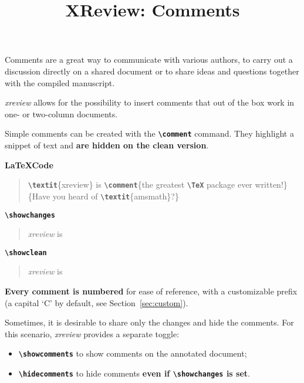 \documentclass[10pt]{article}
\title{XReview: Comments}
\date{}
\newcommand{\writecommand}[1]{\texttt{\textbf{{\textbackslash#1}}}}
\newcommand{\writearg}[1]{\{#1\}}
\begin{document}
\maketitle

Comments are a great way to communicate with various authors, to carry out a discussion directly on a shared document or to share ideas and questions together with the compiled manuscript.

\textit{xreview} allows for the possibility to insert comments that out of the box work in one- or two-column documents. 

Simple comments can be created with the \writecommand{comment} command. They highlight a snippet of text and \textbf{are hidden on the clean version}. 
~\newline

\textbf{\LaTeX Code}

\begin{quote}
\writecommand{textit}\writearg{xreview} is \writecommand{comment}\writearg{the greatest \writecommand{TeX} package ever written!}\writearg{Have you heard of \writecommand{textit}\writearg{amsmath}?}
\end{quote}

\writecommand{showchanges}
\showchanges

\begin{quote}
\textit{xreview} is 
\end{quote}

\writecommand{showclean}
\showclean

\begin{quote}
\textit{xreview} is 
\end{quote} \addtocounter{commentcounter}{-1}

\showchanges

\textbf{Every comment is numbered} for ease of reference, with a customizable prefix (a capital `C' by default, see Section~\ref{sec:custom}).

Sometimes, it is desirable to share only the changes and hide the comments. For this scenario, \textit{xreview} provides a separate toggle:
\begin{itemize}
    \item \writecommand{showcomments} to show comments on the annotated document;
    \item \writecommand{hidecomments} to hide comments \textbf{even if \writecommand{showchanges} is set}.
\end{itemize}
\end{document}
